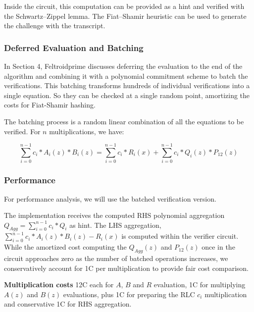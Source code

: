 Inside the circuit, this computation can be provided as a hint and verified with the Schwartz--Zippel lemma. The Fiat--Shamir heuristic can be used to generate the challenge with the transcript.

\subsubsection{Deferred Evaluation and Batching}

In Section 4, Feltroidprime discusses deferring the evaluation to the end of the algorithm and combining it with a polynomial commitment scheme to batch the verifications. This batching transforms hundreds of individual verifications into a single equation. So they can be checked at a single random point, amortizing the costs for Fiat-Shamir hashing.

The batching process is a random linear combination of all the equations to be verified. For $n$ multiplications, we have:

\begin{equation}
    \label{fxfm_batched}
    \sum_{i=0}^{n-1}{c_i*A_i(z)*B_i(z)} =  \sum_{i=0}^{n-1}{c_i*R_i(x) + \sum_{i=0}^{n-1}{c_i*Q_i(z)*P_{12}(z)}}
\end{equation}

\subsubsection{Performance}

For performance analysis, we will use the batched verification version.



The implementation receives the computed RHS polynomial aggregation $Q_{Agg} = \sum_{i=0}^{n-1}{c_i*Q_i}$ as hint. The LHS aggregation, $\sum_{i=0}^{n-1}{c_i*A_i(z)*B_i(z) - R_i(x)}$ is computed within the verifier circuit. While the amortized cost computing the $Q_{Agg}(z)$ and $P_{12}(z)$ once in the circuit approaches zero as the number of batched operations increases, we conservatively account for 1C per multiplication to provide fair cost comparison.

\textbf{Multiplication costs} 12C each for $A$, $B$ and $R$ evaluation, 1C for multiplying $A(z)$ and $B(z)$ evaluations, plus 1C for preparing the RLC $c_i$ multiplication and conservative 1C for RHS aggregation.

